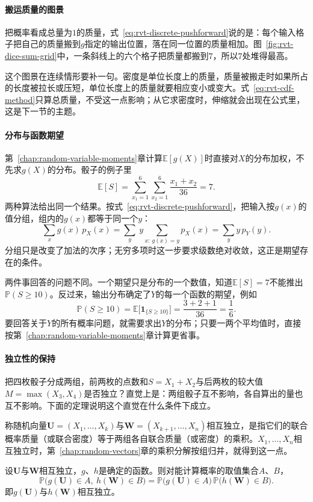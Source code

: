 \paragraph{搬运质量的图景}
把概率看成总量为$1$的质量，式~\eqref{eq:rvt-discrete-pushforward}说的是：每个输入格子把自己的质量搬到$g$指定的输出位置，落在同一位置的质量相加。图~\ref{fig:rvt-dice-sum-grid}中，一条斜线上的六个格子把质量都搬到$7$，所以$7$处堆得最高。

这个图景在连续情形要补一句。密度是单位长度上的质量，质量被搬走时如果所占的长度被拉长或压短，单位长度上的质量就要相应变小或变大。式~\eqref{eq:rvt-cdf-method}只算总质量，不受这一点影响；从它求密度时，伸缩就会出现在公式里，这是下一节的主题。

\paragraph{分布与函数期望}
第~\ref{chap:random-variable-moments}章计算$\mathbb{E}[g(X)]$时直接对$X$的分布加权，不先求$g(X)$的分布。骰子的例子里
\[
 \mathbb{E}[S]=\sum_{x_1=1}^{6}\sum_{x_2=1}^{6}\frac{x_1+x_2}{36}=7 .
\]
两种算法给出同一个结果。按式~\eqref{eq:rvt-discrete-pushforward}，把输入按$g(x)$的值分组，组内的$g(x)$都等于同一个$y$：
\[
 \sum_{x}g(x)\,p_X(x)=\sum_{y}\ y\sum_{x:\ g(x)=y}p_X(x)=\sum_{y}y\,p_Y(y) .
\]
分组只是改变了加法的次序；无穷多项时这一步要求级数绝对收敛，这正是期望存在的条件。

两件事回答的问题不同。一个期望只是分布的一个数值，知道$\mathbb{E}[S]=7$不能推出$\mathbb{P}(S\geq10)$。反过来，输出分布确定了$Y$的每一个函数的期望，例如
\[
 \mathbb{P}(S\geq10)=\mathbb{E}\bigl[\mathbf{1}_{\{S\geq10\}}\bigr]=\frac{3+2+1}{36}=\frac16 .
\]
要回答关于$Y$的所有概率问题，就需要求出$Y$的分布；只要一两个平均值时，直接按第~\ref{chap:random-variable-moments}章计算更省事。

\paragraph{独立性的保持}
把四枚骰子分成两组，前两枚的点数和$S=X_1+X_2$与后两枚的较大值$M=\max(X_3,X_4)$是否独立？直觉上是：两组骰子互不影响，各自算出的量也互不影响。下面的定理说明这个直觉在什么条件下成立。

称随机向量$\bm{U}=(X_1,\ldots,X_k)$与$\bm{W}=(X_{k+1},\ldots,X_n)$相互独立，是指它们的联合概率质量（或联合密度）等于两组各自联合质量（或密度）的乘积。$X_1,\ldots,X_n$相互独立时，第~\ref{chap:random-vectors}章的乘积分解按组归并，就得到这一点。

\begin{theorem}[分组变换保持独立]
\label{thm:rvt-group-independence}
设$\bm{U}$与$\bm{W}$相互独立，$g$、$h$是确定的函数。则对能计算概率的取值集合$A$、$B$，
\begin{equation}
 \mathbb{P}\bigl(g(\bm{U})\in A,\ h(\bm{W})\in B\bigr)=\mathbb{P}\bigl(g(\bm{U})\in A\bigr)\,\mathbb{P}\bigl(h(\bm{W})\in B\bigr) .
 \label{eq:rvt-group-independence}
\end{equation}
即$g(\bm{U})$与$h(\bm{W})$相互独立。
\end{theorem}

